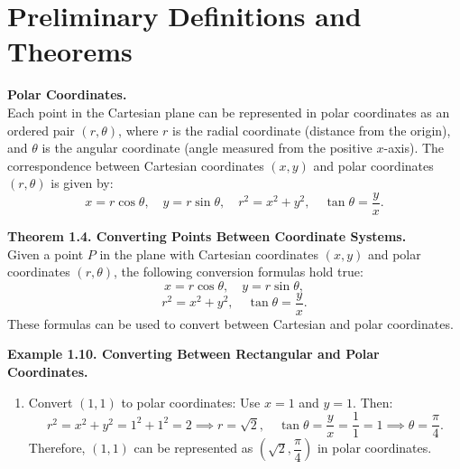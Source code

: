 \documentclass{article}
\begin{document}
\renewcommand{\familydefault}{\rmdefault}



\setcounter{page}{0}

\newpage
\tableofcontents
\newpage



\section*{Preliminary Definitions and Theorems}

\begin{definitionbox}
\textbf{Polar Coordinates.} \\
Each point in the Cartesian plane can be represented in polar coordinates as an ordered pair $(r, \theta)$, where $r$ is the radial coordinate (distance from the origin), and $\theta$ is the angular coordinate (angle measured from the positive $x$-axis).  
The correspondence between Cartesian coordinates $(x, y)$ and polar coordinates $(r, \theta)$ is given by:
\[
x = r\cos\theta, \quad y = r\sin\theta, \quad r^2 = x^2 + y^2, \quad \tan\theta = \frac{y}{x}.
\]
\end{definitionbox}

\begin{theorembox}
\textbf{Theorem 1.4. Converting Points Between Coordinate Systems.} \\
Given a point $P$ in the plane with Cartesian coordinates $(x, y)$ and polar coordinates $(r, \theta)$, the following conversion formulas hold true:
\[
x = r\cos\theta, \quad y = r\sin\theta,
\]
\[
r^2 = x^2 + y^2, \quad \tan\theta = \frac{y}{x}.
\]
These formulas can be used to convert between Cartesian and polar coordinates.
\end{theorembox}

\begin{examplebox}
\textbf{Example 1.10. Converting Between Rectangular and Polar Coordinates.}
\begin{enumerate}
    \item Convert $(1, 1)$ to polar coordinates:  
    Use $x = 1$ and $y = 1$. Then:
    \[
    r^2 = x^2 + y^2 = 1^2 + 1^2 = 2 \implies r = \sqrt{2}, \quad \tan\theta = \frac{y}{x} = \frac{1}{1} = 1 \implies \theta = \frac{\pi}{4}.
    \]
    Therefore, $(1, 1)$ can be represented as $(\sqrt{2}, \dfrac{\pi}{4})$ in polar coordinates.
\end{enumerate}
\end{examplebox}
\end{document}
